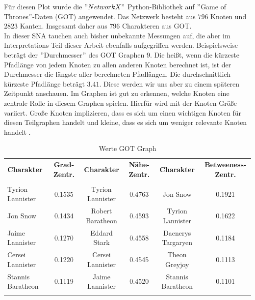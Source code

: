 Für diesen Plot wurde die $"NetworkX"$ Python-Bibliothek auf $"$Game of Thrones$"$-Daten (GOT) angewendet. Das Netzwerk besteht aus $796$ Knoten und $2823$ Kanten. Insgesamt daher aus $796$ Charakteren aus GOT.\\
In dieser SNA tauchen auch bisher unbekannte Messungen auf, die aber im Interpretations-Teil dieser Arbeit ebenfalls aufgegriffen werden. Beispielsweise beträgt der $"$Durchmesser$"$ des GOT Graphen $9$. Die heißt, wenn die kürzeste Pfadlänge von jedem Knoten zu allen anderen Knoten berechnet ist, ist der Durchmesser die längste aller berechneten Pfadlängen. Die durchschnittlich kürzeste Pfadlänge beträgt $3.41$. Diese werden wir uns aber zu einem späteren Zeitpunkt anschauen. Im Graphen ist gut zu erkennen, welche Knoten eine zentrale Rolle in diesem Graphen spielen. Hierfür wird mit der Knoten-Größe variiert. Große Knoten implizieren, dass es sich um einen wichtigen Knoten für diesen Teilgraphen handelt und kleine, dass es sich um weniger relevante Knoten handelt \cite{GOT}. 
\begin{table}[h!]
\footnotesize
\caption{Werte GOT Graph}
\label{TableGOT}
\begin{tabular}{lccccc}\toprule 
\textbf{Charakter} &\textbf{Grad-Zentr.} & \textbf{Charakter} &\textbf{Nähe-Zentr.}  & \textbf{Charakter} &\textbf{Betweeness-Zentr.} \\
 &\\\midrule
  Tyrion Lannister & 0.1535  & Tyrion Lannister & 0.4763 & Jon Snow& 0.1921   \\
  Jon Snow & 0.1434 & Robert Baratheon & 0.4593 & Tyrion Lannister & 0.1622   \\
  Jaime Lannister & 0.1270  & Eddard Stark& 0.4558& Daenerys Targaryen & 0.1184   \\
  Cersei Lannister & 0.1220 & Cersei Lannister & 0.4545 & Theon Greyjoy & 0.1113   \\
  Stannis Baratheon & 0.1119 & Jaime Lannister & 0.4520 & Stannis Baratheon & 0.1101   \\
       
  \\\bottomrule
 \end{tabular}
 \end{table}
